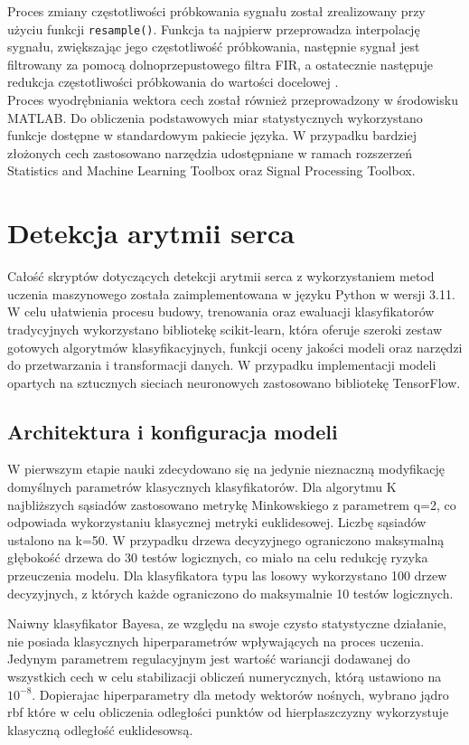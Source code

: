 \documentclass[a4paper,twoside,12pt]{book}
\begin{document}
Proces zmiany częstotliwości próbkowania sygnału został zrealizowany przy użyciu funkcji \texttt{resample()}. Funkcja ta najpierw przeprowadza interpolację sygnału, zwiększając jego częstotliwość próbkowania, następnie sygnał jest filtrowany za pomocą dolnoprzepustowego filtra FIR, a ostatecznie następuje redukcja częstotliwości próbkowania do wartości docelowej \cite{mathworks_resample_2025}.\\


Proces wyodrębniania wektora cech został również przeprowadzony w środowisku MATLAB. Do obliczenia podstawowych miar statystycznych wykorzystano funkcje dostępne w standardowym pakiecie języka. W przypadku bardziej złożonych cech zastosowano narzędzia udostępniane w ramach rozszerzeń Statistics and Machine Learning Toolbox oraz Signal Processing Toolbox.


\chapter{Detekcja arytmii serca}
Całość skryptów dotyczących detekcji arytmii serca z wykorzystaniem metod uczenia maszynowego została zaimplementowana w języku Python w wersji 3.11. W celu ułatwienia procesu budowy, trenowania oraz ewaluacji klasyfikatorów tradycyjnych wykorzystano bibliotekę scikit-learn, która oferuje szeroki zestaw gotowych algorytmów klasyfikacyjnych, funkcji oceny jakości modeli oraz narzędzi do przetwarzania i transformacji danych. W przypadku implementacji modeli opartych na sztucznych sieciach neuronowych zastosowano bibliotekę TensorFlow.
\section{Architektura i konfiguracja modeli}
W pierwszym etapie nauki zdecydowano się na jedynie nieznaczną modyfikację domyślnych parametrów klasycznych klasyfikatorów. Dla algorytmu K najbliższych sąsiadów zastosowano metrykę Minkowskiego z parametrem q=2, co odpowiada wykorzystaniu klasycznej metryki euklidesowej. Liczbę sąsiadów ustalono na k=50. W przypadku drzewa decyzyjnego ograniczono maksymalną głębokość drzewa do 30 testów logicznych, co miało na celu redukcję ryzyka przeuczenia modelu. Dla klasyfikatora typu las losowy wykorzystano 100 drzew decyzyjnych, z których każde ograniczono do maksymalnie 10 testów logicznych.

Naiwny klasyfikator Bayesa, ze względu na swoje czysto statystyczne działanie, nie posiada klasycznych hiperparametrów wpływających na proces uczenia. Jedynym parametrem regulacyjnym jest wartość wariancji dodawanej do wszystkich cech w celu stabilizacji obliczeń numerycznych, którą ustawiono na $10^{-8}$.
Dopierajac hiperparametry dla metody wektorów nośnych, wybrano jądro rbf które w celu obliczenia odległości punktów od hierpłaszczyzny wykorzystuje klasyczną odległość euklidesowsą.
\end{document}

